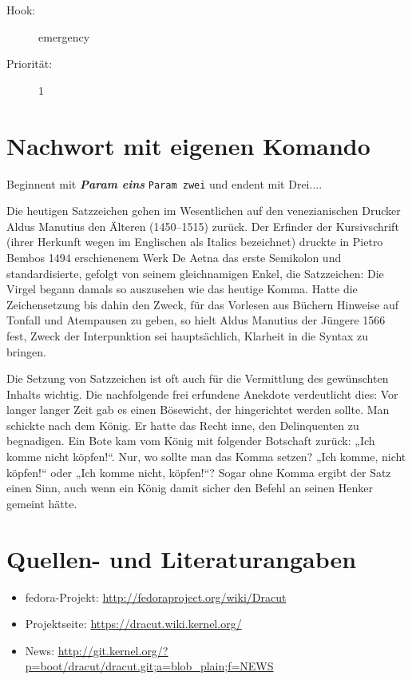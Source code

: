 \documentclass[10pt,a4paper]{article}
\newcommand{\doppelt}[2]{\textit{\textbf{#1}} \texttt{#2}}
\begin{document}
\begin{description}
\item[Hook:] emergency
\item[Priorität:] 1
\end{description}

\section{Nachwort mit eigenen Komando}

Beginnent mit \doppelt{Param eins}{Param zwei} und endent mit Drei....

Die heutigen Satzzeichen gehen im Wesentlichen auf den venezianischen Drucker
Aldus Manutius den Älteren (1450–1515) zurück. Der Erfinder der Kursivschrift
(ihrer Herkunft wegen im Englischen als Italics bezeichnet) druckte in Pietro
Bembos 1494 erschienenem Werk De Aetna das erste Semikolon und standardisierte,
gefolgt von seinem gleichnamigen Enkel, die Satzzeichen: Die Virgel begann
damals so auszusehen wie das heutige Komma. Hatte die Zeichensetzung bis dahin
den Zweck, für das Vorlesen aus Büchern Hinweise auf Tonfall und Atempausen zu
geben, so hielt Aldus Manutius der Jüngere 1566 fest, Zweck der Interpunktion
sei hauptsächlich, Klarheit in die Syntax zu bringen.


Die Setzung von Satzzeichen ist oft auch für die Vermittlung des gewünschten
Inhalts wichtig. Die nachfolgende frei erfundene Anekdote verdeutlicht dies:
Vor langer langer Zeit gab es einen Bösewicht, der hingerichtet werden sollte.
Man schickte nach dem König. Er hatte das Recht inne, den Delinquenten zu
begnadigen. Ein Bote kam vom König mit folgender Botschaft zurück: „Ich
komme nicht köpfen!“. Nur, wo sollte man das Komma setzen? „Ich komme, nicht
köpfen!“ oder „Ich komme nicht, köpfen!“? Sogar ohne Komma ergibt der Satz
einen Sinn, auch wenn ein König damit sicher den Befehl an seinen Henker
gemeint hätte.


\section{Quellen- und Literaturangaben}
\label{sec:quell}

\begin{itemize}
 \item fedora-Projekt: \url{http://fedoraproject.org/wiki/Dracut}
 \item Projektseite: \url{https://dracut.wiki.kernel.org/}
 \item News: \url{http://git.kernel.org/?p=boot/dracut/dracut.git;a=blob_plain;f=NEWS}
\end{itemize}


\end{document}
